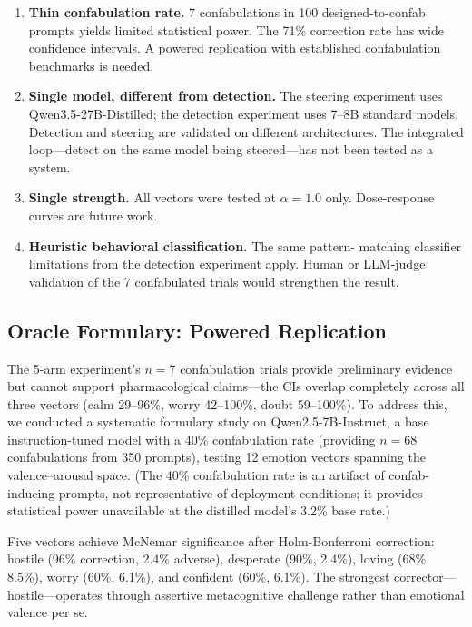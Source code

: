 \begin{enumerate}[nosep]
  \item \textbf{Thin confabulation rate.} 7 confabulations in 100
    designed-to-confab prompts yields limited statistical power. The
    71\% correction rate has wide confidence intervals. A powered
    replication with established confabulation benchmarks is needed.
  \item \textbf{Single model, different from detection.} The steering
    experiment uses Qwen3.5-27B-Distilled; the detection experiment uses
    7--8B standard models. Detection and steering are validated on
    different architectures. The integrated loop---detect on the same
    model being steered---has not been tested as a system.
  \item \textbf{Single strength.} All vectors were tested at
    $\alpha = 1.0$ only. Dose-response curves are future work.
  \item \textbf{Heuristic behavioral classification.} The same pattern-
    matching classifier limitations from the detection experiment
    apply. Human or LLM-judge validation of the 7 confabulated trials
    would strengthen the result.
\end{enumerate}

\subsection{Oracle Formulary: Powered Replication}
\label{sec:formulary}

The 5-arm experiment's $n = 7$ confabulation trials provide preliminary
evidence but cannot support pharmacological claims---the CIs overlap
completely across all three vectors (calm 29--96\%, worry 42--100\%,
doubt 59--100\%). To address this, we conducted a systematic formulary
study on Qwen2.5-7B-Instruct, a base instruction-tuned model with a
40\% confabulation rate (providing $n = 68$ confabulations from 350
prompts), testing 12 emotion vectors spanning the valence--arousal space.
(The 40\% confabulation rate is an artifact of confab-inducing prompts,
not representative of deployment conditions; it provides statistical
power unavailable at the distilled model's 3.2\% base rate.)

Five vectors achieve McNemar significance after Holm-Bonferroni
correction: hostile (96\% correction, 2.4\% adverse), desperate (90\%,
2.4\%), loving (68\%, 8.5\%), worry (60\%, 6.1\%), and confident (60\%,
6.1\%). The strongest corrector---hostile---operates through assertive
metacognitive challenge rather than emotional valence per se.

